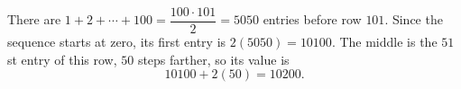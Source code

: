 There are $1+2+\cdots+100=\dfrac{100\cdot101}{2}=5050$ entries before row $101$. Since the sequence starts at zero, its first entry is $2(5050)=10100$. The middle is the $51$st entry of this row, $50$ steps farther, so its value is
\[
\boxed{10100+2(50)=10200}.
\]
